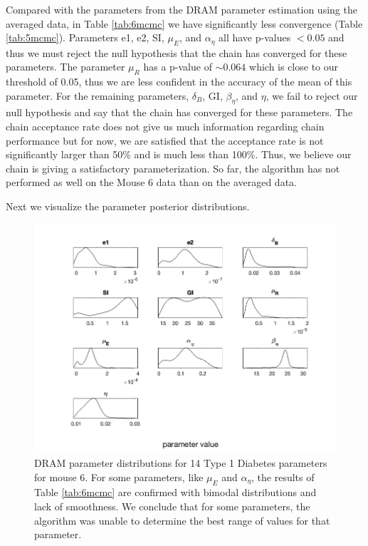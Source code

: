 Compared with the parameters from the DRAM parameter estimation using the averaged data, in Table \ref{tab:6mcmc} we have significantly less convergence (Table \ref{tab:5mcmc}). Parameters e1, e2, SI,  $\mu_E$, and $\alpha_\eta$ all have p-values $< 0.05$ and thus we must reject the null hypothesis that the chain has converged for these parameters. The parameter $\mu_R$ has a p-value of $\sim 0.064$ which is close to our threshold of 0.05, thus we are less confident in the accuracy of the mean of this parameter. For the remaining parameters, $\delta_B$, GI, $\beta_\eta$, and $\eta$, we fail to reject our null hypothesis and say that the chain has converged for these parameters. The chain acceptance rate does not give us much information regarding chain performance but for now, we are satisfied that the acceptance rate is not significantly larger than 50\% and is much less than 100\%. Thus, we believe our chain is giving a satisfactory parameterization. So far, the algorithm has not performed as well on the Mouse 6 data than on the averaged data.
\par Next we visualize the parameter posterior distributions.
\begin{figure}[H]
    \centering
    \includegraphics[width=15cm]{MCMC_figs/dram_t1d_final/jul10_mouse6_run1(noIC)_acute_NOD_waveOn_lietal_den.png}
    \caption{DRAM parameter distributions for 14 Type 1 Diabetes parameters for mouse 6. For some parameters, like $\mu_E$ and $\alpha_\eta$, the results of Table \ref{tab:6mcmc} are confirmed with bimodal distributions and lack of smoothness. We conclude that for some parameters, the algorithm was unable to determine the best range of values for that parameter.}
    \label{fig:19mcmc}
\end{figure}
